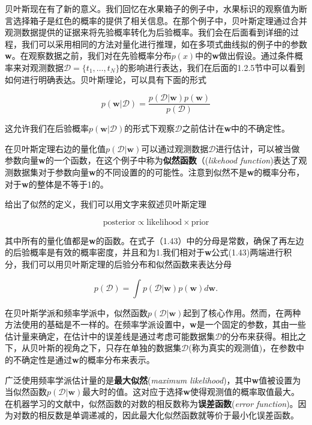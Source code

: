	 贝叶斯现在有了新的意义。我们回忆在水果箱子的例子中，水果标识的观察值为断言选择箱子是红色的概率的提供了相关信息。在那个例子中，贝叶斯定理通过合并观测数据提供的证据来将先验概率转化为后验概率。我们会在后面看到详细的过程，我们可以采用相同的方法对量化进行推理，如在多项式曲线拟的例子中的参数\textbf{w}。在观察数据之前，我们对在先验概率分布$p(x)$中的\textbf{w}做出假设。通过条件概率来对观测数据$\mathcal{D} = \{ t_1, \dots, t_N \}$的影响进行表达，我们在后面的1.2.5节中可以看到如何进行明确表达。贝叶斯理论，可以具有下面的形式
	 
	 \begin{equation}
	 p(\textbf{w} | \mathcal{D}) = \frac{p(\mathcal{D} | \textbf{w})p(\textbf{w})}{p(\mathcal{D})}
	 \end{equation}
	 
	 这允许我们在后验概率$p(\textbf{w}|\mathcal{D})$的形式下观察$\mathcal{D}$之前估计在\textbf{w}中的不确定性。
	 
	 在贝叶斯定理右边的量化值$p(\mathcal{D} | \textbf{w})$可以通过观测数据$\mathcal{D}$进行估计，可以被当做参数向量\textbf{w}的一个函数，在这个例子中称为\textbf{似然函数}（(\textit{likehood function})表达了观测数据集对于参数向量\textbf{w}的不同设置的的可能性。注意到似然不是\textbf{w}的概率分布，对于\textbf{w}的整体是不等于1的。
	 
	 给出了似然的定义，我们可以用文字来叙述贝叶斯定理
	 
	 \begin{equation}
	 \mathrm{posterior \propto likelihood \times prior}
	 \end{equation}
	 
	 其中所有的量化值都是\textbf{w}的函数。在式子（1.43）中的分母是常数，确保了再左边的后验概率是有效的概率密度，并且和为1.我们相对于\textbf{w}公式(1.43)两端进行积分，我们可以用贝叶斯定理的后验分布和似然函数来表达分母
	 
	 \begin{equation}
	 p(\mathcal{D}) = \int p(\mathcal{D} | \textbf{w}) p(\textbf{w}) d\textbf{w}.
	 \end{equation}
	 
	 在贝叶斯学派和频率学派中，似然函数$p(\mathcal{D} | \textbf{w})$起到了核心作用。然而，在两种方法使用的基础是不一样的。在频率学派设置中，\textbf{w}是一个固定的参数，其由一些估计量来确定，在估计中的误差线是通过考虑可能数据集$\mathcal{D}$的分布来获得。相比之下，从贝叶斯的视角之下，只存在单独的数据集$\mathcal{D}$(称为真实的观测值)，在参数中的不确定性是通过\textbf{w}的概率分布来表示。
	 
	 广泛使用频率学派估计量的是\textbf{最大似然}(\textit{maximum likelihood})，其中\textbf{w}值被设置为当似然函数$p(\mathcal{D} | \textbf{w})$最大时的值。这对应于选择\textbf{w}使得观测值的概率取值最大。在机器学习的文献中，似然函数的对数的相反数称为\textbf{误差函数}(\textit{error function})。因为对数的相反数是单调递减的，因此最大化似然函数就等价于最小化误差函数。
	 
